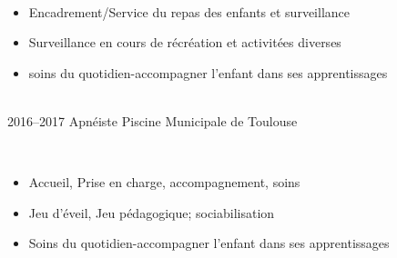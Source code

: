 \documentclass[]{cv-style}          %
\begin{document}
\begin{entrylist}
{\\
	\begin{itemize}
		\item Encadrement/Service du repas des enfants et surveillance
		\item Surveillance en cours de récréation et activitées diverses
		\item soins du quotidien-accompagner l’enfant dans ses apprentissages
	\end{itemize}}\\
\entry
{2016--2017}
{Apnéiste}
{Piscine Municipale de Toulouse}
{\\
	\begin{itemize}
		\item Accueil, Prise en charge, accompagnement, soins
		\item Jeu d’éveil, Jeu pédagogique; sociabilisation
		\item Soins du quotidien-accompagner l’enfant dans ses apprentissages
\end{itemize}}\\
\end{entrylist}
\newpage
{}
\end{document}
